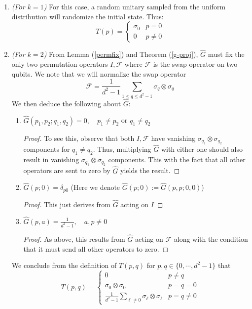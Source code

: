 \documentclass[12pt]{amsart}
\theoremstyle{definition}
\theoremstyle{remark}
\numberwithin{equation}{section}
\theoremstyle{remark}
\begin{document}
\begin{enumerate}
  \item \emph{(For $k = 1$)} For this case, a random unitary sampled from the uniform distribution will randomize the initial state. Thus:
  $$
  T(p) = \begin{cases}
    \sigma_0 & p = 0 \\
    0 & p \neq 0
  \end{cases}
  $$
  \item \emph{(For $k=2$)} From Lemma (\ref{permfix}) and Theorem (\ref{g-proj}), $\widehat{G}$ must fix the only two permutation operators $I, \mathcal{F}$ where $\mathcal{F}$ is the swap operator on two qubits. We note that we will normalize the swap operator
  \begin{equation}
    \mathcal{F} = \frac{1}{d^2 -1 }\sum_{1 \leq q \leq d^2 -1} \sigma_{q} \otimes \sigma_{q}
  \end{equation}
  We then deduce the following about $\widehat{G}$: \newline
    \begin{enumerate}
      \item $\widehat{G}(p_1,p_2;q_1,q_2) = 0, \quad p_1 \neq p_2$ or $q_1 \neq q_2$
      \begin{proof}
        To see this, observe that both $I, \mathcal{F}$ have vanishing $\sigma_{q_1} \otimes \sigma_{q_2}$ components for $q_1 \neq q_2$. Thus, multiplying $\widehat{G}$ with either one should also result in vanishing $\sigma_{q_1} \otimes \sigma_{q_2}$ components. This with the fact that all other operators are sent to zero by $\widehat{G}$ yields the result.
      \end{proof}

      \item $\widehat{G}(p;0) = \delta_{p0}$ (Here we denote $\widehat{G}(p;0) := \widehat{G}(p,p;0,0)$)
      \begin{proof}
        This just derives from $\widehat{G}$ acting on $I$
      \end{proof}

      \item $\widehat{G}(p,a) = \frac{1}{d^2-1}, \quad a,p \neq 0$
      \begin{proof}
        As above, this results from $\widehat{G}$ acting on $\mathcal{F}$ along with the condition that it must send all other operators to zero.
      \end{proof}
    \end{enumerate}
    We conclude from the definition of $T(p,q)$ for $p,q \in \{0,\cdots,d^2-1\}$ that
    \begin{equation} \label{concreteT}
      T(p,q) = \begin{cases}
        0 \quad & p \neq q \\
        \sigma_0 \otimes \sigma_0 & p = q = 0 \\
        \frac{1}{d^2 - 1}\sum_{\ell \neq 0}  \sigma_\ell \otimes \sigma_\ell & p = q \neq 0
      \end{cases}
    \end{equation}
\end{enumerate}
\end{document}
